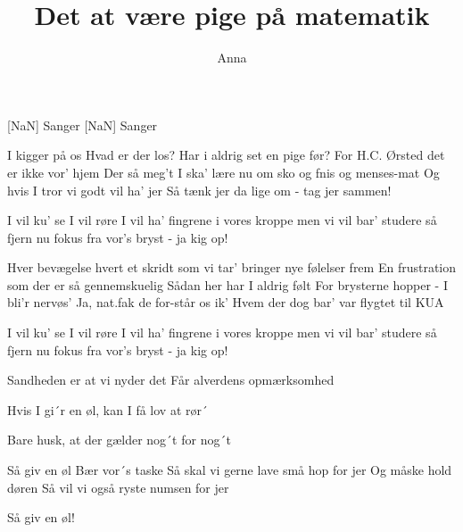 \documentclass[a4paper,11pt]{article}
\title{Det at være pige på matematik}
\author{Anna}
\begin{document}
\maketitle

\begin{roles}
[NaN] Sanger
[NaN] Sanger
\end{roles}

\begin{song}
 I kigger på os
Hvad er der los?
Har i aldrig set en pige før?
For H.C. Ørsted
det er ikke vor' hjem
Der så meg't I ska' lære nu
om sko og fnis og menses-mat
Og hvis I tror vi godt vil ha' jer
Så tænk jer da lige om - tag jer sammen!

 I vil ku' se
I vil røre
I vil ha' fingrene i vores kroppe
men vi vil
bar' studere
så fjern nu fokus fra vor's bryst - ja kig op!

 Hver bevægelse
hvert et skridt som vi tar'
bringer nye følelser frem
En frustration
som der er så gennemskuelig
Sådan her har I aldrig følt
For brysterne hopper - I bli'r nervøs'
Ja, nat.fak de for-står os ik'
Hvem der dog bar' var flygtet til KUA

 I vil ku' se
I vil røre
I vil ha' fingrene i vores kroppe
men vi vil
bar' studere
så fjern nu fokus fra vor's bryst - ja kig op!

 Sandheden er at vi nyder det
Får alverdens opmærksomhed

 Hvis I gi´r en øl, kan I få lov at rør´

 Bare husk, at der gælder nog´t for nog´t

 Så giv en øl
Bær vor´s taske
Så skal vi gerne lave små hop for jer
Og måske
hold døren
Så vil vi også ryste numsen for jer

 Så giv en øl!
\end{song}
\end{document}
